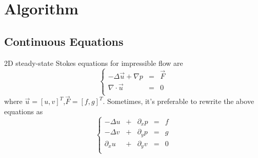 \section{Algorithm}
\subsection{Continuous Equations}
2D steady-state Stokes equations for impressible flow are
\begin{equation}
    \left\{
    \begin{array}{ccc}
        -\Delta \vec u + \nabla p &=& \vec F\\
        \nabla \cdot \vec u &=&0\\
    \end{array}
    \right.
\end{equation}
where $\vec u =[u,v]^T$,$\vec F=[f,g]^T$. Sometimes, it's preferable to 
rewrite the above equations as
\begin{equation}
    \label{equ:continous}
    \left\{
    \begin{array}{ccccc}
        -\Delta u &+& \partial_x p &=& f\\
        -\Delta v &+& \partial_y p &=& g\\
        \partial_x u &+& \partial_y v &=&0\\
    \end{array}
    \right.
\end{equation}

